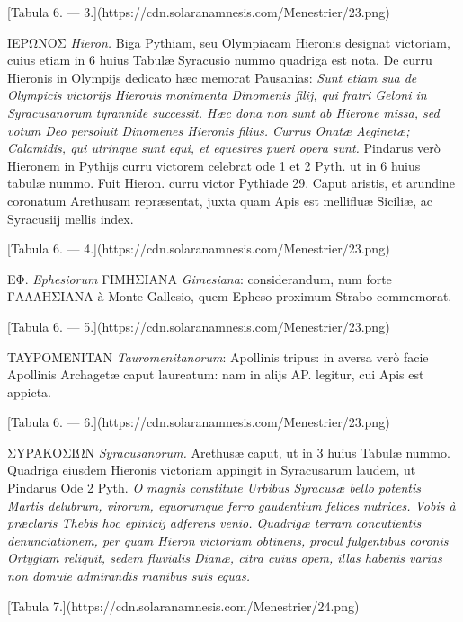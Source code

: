 \documentclass[a4paper, 11pt, oneside, polutonikogreek, latin]{article}
\begin{document}
[Tabula 6. --- 3.](https://cdn.solaranamnesis.com/Menestrier/23.png)

IEPΩNOΣ \emph{Hieron.} Biga Pythiam, seu Olympiacam Hieronis designat victoriam, cuius etiam in 6 huius Tabulæ Syracusio nummo quadriga est nota. De curru Hieronis in Olympijs dedicato hæc memorat Pausanias: \emph{Sunt etiam sua de Olympicis victorijs Hieronis monimenta Dinomenis filij, qui fratri Geloni in Syracusanorum tyrannide successit. Hæc dona non sunt ab Hierone missa, sed votum Deo persoluit Dinomenes Hieronis filius. Currus Onatæ Aeginetæ; Calamidis, qui utrinque sunt equi, et equestres pueri opera sunt.} Pindarus verò Hieronem in Pythijs curru victorem celebrat ode 1 et 2 Pyth. ut in 6 huius tabulæ nummo. Fuit Hieron. curru victor Pythiade 29. Caput aristis, et arundine coronatum Arethusam repræsentat, juxta quam Apis est mellifluæ Siciliæ, ac Syracusiij mellis index.

[Tabula 6. --- 4.](https://cdn.solaranamnesis.com/Menestrier/23.png)

EΦ. \emph{Ephesiorum} ΓIMHΣIANA \emph{Gimesiana}: considerandum, num forte ΓAΛΛHΣIANA à Monte Gallesio, quem Epheso proximum Strabo commemorat.

[Tabula 6. --- 5.](https://cdn.solaranamnesis.com/Menestrier/23.png)

TAYPOMENITAN \emph{Tauromenitanorum}: Apollinis tripus: in aversa verò facie Apollinis Archagetæ caput laureatum: nam in alijs AP. legitur, cui Apis est appicta.

[Tabula 6. --- 6.](https://cdn.solaranamnesis.com/Menestrier/23.png)

ΣYPAKOΣIΩN \emph{Syracusanorum.} Arethusæ caput, ut in 3 huius Tabulæ nummo. Quadriga eiusdem Hieronis victoriam appingit in Syracusarum laudem, ut Pindarus Ode 2 Pyth. \emph{O magnis constitute Urbibus Syracusæ bello potentis Martis delubrum, virorum, equorumque ferro gaudentium felices nutrices. Vobis à præclaris Thebis hoc epinicij adferens venio. Quadrigæ terram concutientis denunciationem, per quam Hieron victoriam obtinens, procul fulgentibus coronis Ortygiam reliquit, sedem fluvialis Dianæ, citra cuius opem, illas habenis varias non domuie admirandis manibus suis equas.}

[Tabula 7.](https://cdn.solaranamnesis.com/Menestrier/24.png)
\end{document}
